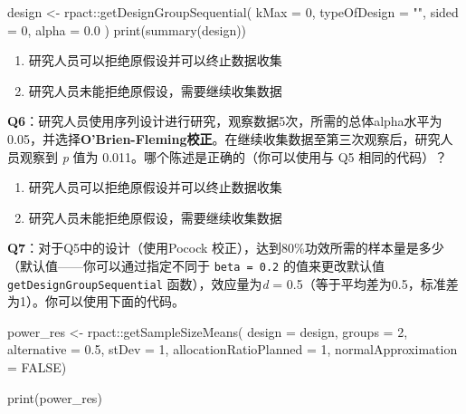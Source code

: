 \documentclass[
  letterpaper,
  DIV=11,
  numbers=noendperiod]{scrreprt}
\newenvironment{Shaded}{\begin{snugshade}}{\end{snugshade}}
\newcommand{\AttributeTok}[1]{\textcolor[rgb]{0.40,0.45,0.13}{#1}}
\newcommand{\ConstantTok}[1]{\textcolor[rgb]{0.56,0.35,0.01}{#1}}
\newcommand{\DecValTok}[1]{\textcolor[rgb]{0.68,0.00,0.00}{#1}}
\newcommand{\FloatTok}[1]{\textcolor[rgb]{0.68,0.00,0.00}{#1}}
\newcommand{\FunctionTok}[1]{\textcolor[rgb]{0.28,0.35,0.67}{#1}}
\newcommand{\NormalTok}[1]{\textcolor[rgb]{0.00,0.23,0.31}{#1}}
\newcommand{\OtherTok}[1]{\textcolor[rgb]{0.00,0.23,0.31}{#1}}
\newcommand{\SpecialCharTok}[1]{\textcolor[rgb]{0.37,0.37,0.37}{#1}}
\newcommand{\StringTok}[1]{\textcolor[rgb]{0.13,0.47,0.30}{#1}}
\providecommand{\tightlist}{%
  \setlength{\itemsep}{0pt}\setlength{\parskip}{0pt}}\usepackage{longtable,booktabs,array}
\begin{document}
\begin{Shaded}
\begin{Highlighting}[]
\NormalTok{design }\OtherTok{\textless{}{-}}\NormalTok{ rpact}\SpecialCharTok{::}\FunctionTok{getDesignGroupSequential}\NormalTok{(}
  \AttributeTok{kMax =} \DecValTok{0}\NormalTok{,}
  \AttributeTok{typeOfDesign =} \StringTok{""}\NormalTok{,}
  \AttributeTok{sided =} \DecValTok{0}\NormalTok{,}
  \AttributeTok{alpha =} \FloatTok{0.0}
\NormalTok{)}
\FunctionTok{print}\NormalTok{(}\FunctionTok{summary}\NormalTok{(design))}
\end{Highlighting}
\end{Shaded}

\begin{enumerate}
\def\labelenumi{\Alph{enumi})}
\tightlist
\item
  研究人员可以拒绝原假设并可以终止数据收集
\item
  研究人员未能拒绝原假设，需要继续收集数据
\end{enumerate}

\textbf{Q6}：研究人员使用序列设计进行研究，观察数据5次，所需的总体alpha水平为0.05，并选择\textbf{O'Brien-Fleming校正}。在继续收集数据至第三次观察后，研究人员观察到
\emph{p} 值为 0.011。哪个陈述是正确的（你可以使用与 Q5 相同的代码）？

\begin{enumerate}
\def\labelenumi{\Alph{enumi})}
\tightlist
\item
  研究人员可以拒绝原假设并可以终止数据收集
\item
  研究人员未能拒绝原假设，需要继续收集数据
\end{enumerate}

\textbf{Q7}：对于Q5中的设计（使用Pocock
校正），达到80\%功效所需的样本量是多少（默认值------你可以通过指定不同于
\texttt{beta\ =\ 0.2} 的值来更改默认值\texttt{getDesignGroupSequential}
函数），效应量为\emph{d} =
0.5（等于平均差为0.5，标准差为1）。你可以使用下面的代码。

\begin{Shaded}
\begin{Highlighting}[]
\NormalTok{power\_res }\OtherTok{\textless{}{-}}\NormalTok{ rpact}\SpecialCharTok{::}\FunctionTok{getSampleSizeMeans}\NormalTok{(}
  \AttributeTok{design =}\NormalTok{ design,}
  \AttributeTok{groups =} \DecValTok{2}\NormalTok{,}
  \AttributeTok{alternative =} \FloatTok{0.5}\NormalTok{, }
  \AttributeTok{stDev =} \DecValTok{1}\NormalTok{, }
  \AttributeTok{allocationRatioPlanned =} \DecValTok{1}\NormalTok{,}
  \AttributeTok{normalApproximation =} \ConstantTok{FALSE}\NormalTok{)}

\FunctionTok{print}\NormalTok{(power\_res)}
\end{Highlighting}
\end{Shaded}
\end{document}

